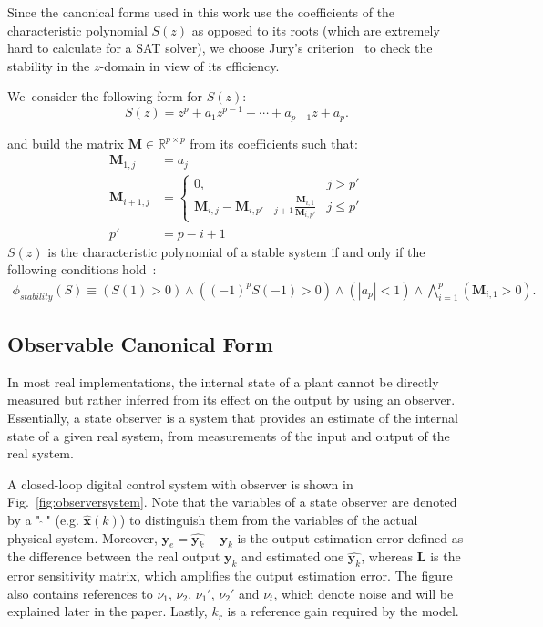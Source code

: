 \documentclass[sigconf]{llncs}
\newcommand{\mat}[1]{\boldsymbol{#1}}
\renewcommand{\vec}[1]{\boldsymbol{#1}}
\begin{document}
Since the canonical forms used in this work use the coefficients of the
characteristic polynomial $S(z)$ as opposed to its roots (which are
extremely hard to calculate for a SAT solver), we choose Jury's
criterion~\cite{astrom1997computer} to check the stability in the
$z$-domain in view of its efficiency.

We~consider the following form for $S(z)$:
%
\begin{equation*}
S(z) = z^{p}+a_1z^{p-1}+\cdots+a_{p-1}z+a_p.
\end{equation*}

and build the matrix
$\mat{M} \in \mathbb{R}^{p \times p}$ from its coefficients such that:
%
\begin{align*}
\mat{M}_{1,j}&=a_j\\
\mat{M}_{i+1,j}&=\left\{
\begin{array}{ll}
0,&j>p'\\
\mat{M}_{i,j}-\mat{M}_{i,p'-j+1}\frac{\mat{M}_{i,1}}{\mat{M}_{i,p'}} &j\leq p'
\end{array}
\right.\\
p'&=p-i+1
\end{align*}
%
$S(z)$ is the characteristic polynomial of a stable system if and
only if the following conditions hold~\cite{astrom1997computer}:
\begin{align*}
\phi_\mathit{stability}(S) \equiv
(S(1) > 0) \wedge ((-1)^p S(-1) > 0) \wedge (|a_p| < 1) \wedge \bigwedge\limits_{i=1}^p (\mat{M}_{i,1} > 0).
\end{align*}

\subsection{Observable Canonical Form} \label{sec:observable}
In most real implementations, the internal state of a plant cannot be
directly measured but rather inferred from its effect on the output by
using an observer.  Essentially, a state observer is a system that
provides an estimate of the internal state of a given real system,
from measurements of the input and output of the real system.

A closed-loop digital control system with observer is shown in Fig.~\ref{fig:observersystem}.
Note that the variables of a state observer are denoted by a "$~\hat{}~$" (e.g. {$\hat {\vec{x}}(k)$})
to distinguish them from the variables of the actual physical system.
Moreover, $\vec{y}_e=\hat{\vec{y}_k}-\vec{y}_k$ is the output estimation error defined
as the difference between the real output $\vec{y}_k$ and estimated one $\hat{\vec{y}_k}$, whereas
$\mat{L}$ is the error sensitivity matrix, which amplifies the output estimation error.
The figure also contains references to $\nu_1$, $\nu_2$, $\nu_1'$, $\nu_2'$ and $\nu_t$, which
denote noise and will be explained later in the paper.
Lastly, $k_r$ is a reference gain required by the model.
\end{document}

